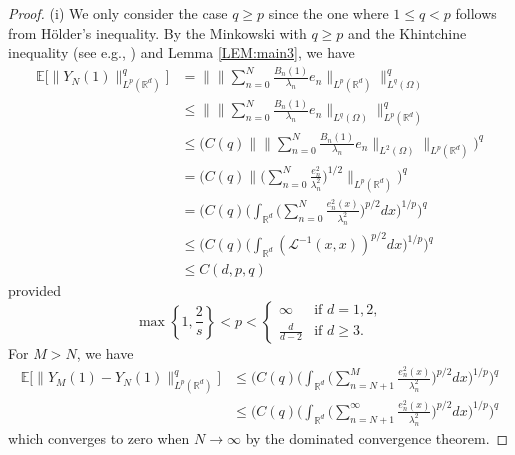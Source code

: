 \documentclass[%
11pt,  reqno]{amsart}
\theoremstyle{remarkstyle}
\newcommand{\1}{\hspace{0.2mm}\text{I}\hspace{0.2mm}}
\newcommand{\R}{\mathbb{R}}
\newcommand{\E}{\mathbb{E}}
\renewcommand{\L}{\mathcal{L}}
\newcommand{\ld}{\lambda}
\renewcommand{\O}{\Omega}
\numberwithin{equation}{section}
\numberwithin{theorem}{section}
\begin{document}
	\begin{proof}
		(i) We only consider the case $q\geq p$ since the one where $1\leq q <p$ follows from H\"older's inequality. By the Minkowski with $q\ge p$ and the Khintchine inequality (see e.g., \cite[Lemma 4.2]{BT08a}) and Lemma \ref{LEM:main3}, we have
		\begin{align*}
			\E \big[\|Y_N(1)\|_{L^p(\R^d)}^q \big] &= \Big\| \Big\|\sum_{n=0}^N \frac{B_n(1)}{\ld_n} e_n \Big\|_{L^p(\R^d)}\Big\|_{L^q(\O)}^q \\
			&\le \Big\| \Big\|\sum_{n=0}^N \frac{B_n(1)}{\ld_n} e_n \Big\|_{L^q(\O)}\Big\|_{L^p(\R^d)}^q \\
			&\le \bigg(C(q) \Big\| \Big\|\sum_{n= 0}^N \frac{B_n(1)}{\ld_n} e_n\Big\|_{L^2(\O)} \Big\|_{L^p(\R^d)}\bigg)^q \\
			&= \bigg(C(q) \Big\| \Big(\sum_{n= 0}^N \frac{e_n^2}{\ld_n^2} \Big)^{1/2} \Big\|_{L^p(\R^d)}\bigg)^q \\
			&= \bigg( C(q) \bigg(\int_{\R^d} \Big( \sum_{n=0}^N \frac{e^2_n(x)}{\ld_n^2}\Big)^{p/2} dx\bigg)^{1/p}\bigg)^q \\
			&\le \bigg( C(q) \bigg(\int_{\R^d} \left( \L^{-1}(x,x)\right)^{p/2} dx\bigg)^{1/p}\bigg)^q \\
			&\le C(d,p,q)
		\end{align*}
		provided 
		$$
		\max \left\{1, \frac2s\right\} < p < \begin{cases}
			\infty &\text{if } d=1,2, \\
			\frac{d}{d-2} &\text{if } d\ge 3.
		\end{cases}
		$$
		For $M>N$, we have
		\begin{align*}
			\E \big[ \|Y_M(1)-Y_N(1)\|^q_{L^p(\R^d)}\big] &\leq \bigg( C(q) \bigg(\int_{\R^d} \Big( \sum_{n=N+1}^M \frac{e^2_n(x)}{\ld_n^2}\Big)^{p/2} dx\bigg)^{1/p}\bigg)^q \\
			&\leq \bigg( C(q) \bigg(\int_{\R^d} \Big( \sum_{n=N+1}^\infty \frac{e^2_n(x)}{\ld_n^2}\Big)^{p/2} dx\bigg)^{1/p}\bigg)^q
		\end{align*}
		which converges to zero when $N \to \infty$ by the dominated convergence theorem. 
		

\end{proof}
\end{document}
